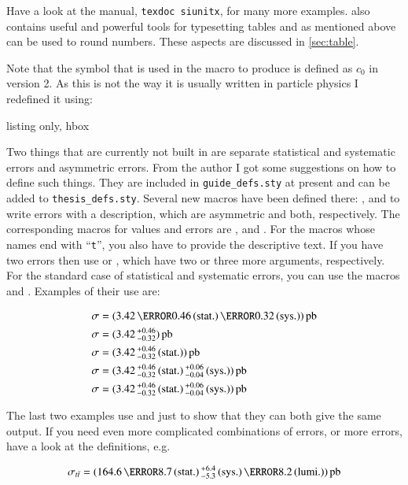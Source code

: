 Have a look at the manual, \texttt{texdoc siunitx}, for many more
examples.  also contains useful and powerful tools
for typesetting tables and as mentioned above can be used to round
numbers. These aspects are discussed in \cref{sec:table}.

Note that the  symbol that is used in the macro
 to produce \si{\MeVovercsq} is defined as \(c_{0}\) in
 version 2. As this is not the way it is usually
written in particle physics I redefined it using:
\begin{tcblisting}{listing only, hbox}
\DeclareSIUnit{}
\end{tcblisting}

Two things that are currently not built in are separate statistical and
systematic errors and asymmetric errors. From the author I got some
suggestions on how to define such things. They are included in
\texttt{guide\_defs.sty} at present and can be added to
\texttt{thesis\_defs.sty}.
Several new macros have been defined there:
,  and  to write
errors with a description, which are asymmetric and both, respectively.
The corresponding macros for values and errors are
,  and . For the macros
whose names end with \enquote{\texttt{t}}, you also have to provide
the descriptive text.
If you have two errors then use 
or , which have two or three more arguments, respectively.
For the standard case of statistical and systematic
errors, you can use the macros  and
. Examples of their use are:
\begin{tcblisting}{}
\begin{align*}
  \sigma & = \SIerrs{3.42}{0.46}{0.32}{\pico\barn}\\
  \sigma & = \SIpmerr{3.42}{+0.46}{-0.32}{\pico\barn}\\
  \sigma & = \SIpmerrt{3.42}{+0.46}{-0.32}{\stat}{\pico\barn}\\
  \sigma & = \SIpmerrs{3.42}{+0.46}{-0.32}{+0.06}{-0.04}{\pico\barn}\\
  \sigma & = \SIpmerrtt{3.42}{+0.46}{-0.32}{\stat}{+0.06}{-0.04}{\sys}{\pico\barn}
\end{align*}
\end{tcblisting}
The last two examples use  and  just
to show that they can both give the same output. If you need even more
complicated combinations of errors, or more errors, have a look at the
definitions, e.g.
\begin{tcblisting}{}
\begin{equation*}
  \sigma_{t\bar{t}} = (\num{164.6}%
  \valuesep\numerrt{8.7}{\stat}%
  \valuesep\numpmerrt{+6.4}{-5.3}{\sys}%
  \valuesep\numerrt{8.2}{lumi.})%
  \valuesep\si{\pico\barn}
\end{equation*}    
\end{tcblisting}


